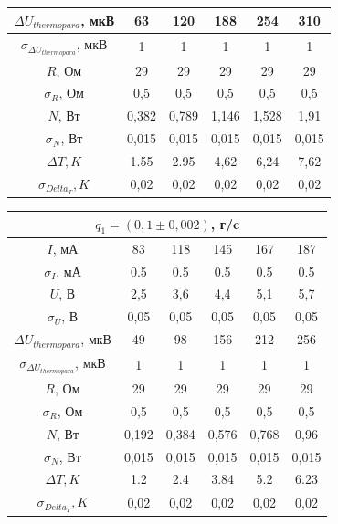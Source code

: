 \documentclass[a4paper, 12pt]{article}%
\begin{document}
\begin{enumerate}
\begin{center}
\begin{tabular}{|c|c|c|c|c|c|}
$\Delta U_{thermopara}$, мкВ & 63 & 120 & 188 & 254 & 310 \\ \hline
$\sigma_{\Delta U_{thermopara}}$, мкВ & 1 & 1 & 1 & 1 & 1 \\ \hline
$R$, Ом & 29 & 29 & 29 & 29 & 29 \\ \hline
$\sigma_R$, Ом & 0,5 & 0,5 & 0,5 & 0,5 & 0,5 \\ \hline
$N$, Вт & 0,382 & 0,789 & 1,146 & 1,528 & 1,91 \\ \hline
$\sigma_N$, Вт & 0,015 & 0,015 & 0,015 & 0,015 & 0,015 \\ \hline
$\Delta T, K$ & 1.55 & 2.95 & 4,62 & 6,24 & 7,62 \\ \hline
$\sigma_{Delta_T}, K$ & 0,02 & 0,02 & 0,02 & 0,02 & 0,02 \\ \hline
\end{tabular}

\begin{tabular}{|c|c|c|c|c|c|}
\hline
\multicolumn{6}{|c|}{$q_1 = (0,1 \pm0,002)$, г/c} \\ \hline
$I$, мА & 83 & 118 & 145 & 167 & 187 \\ \hline
$\sigma_I$, мА & 0.5 & 0.5 & 0.5 & 0.5 & 0.5 \\ \hline
$U$, В & 2,5 & 3,6 & 4,4 & 5,1 & 5,7 \\ \hline
$\sigma_U$, В & 0,05 & 0,05 & 0,05 & 0,05 & 0,05 \\ \hline
$\Delta U_{thermopara}$, мкВ & 49 & 98 & 156 & 212 & 256 \\ \hline
$\sigma_{\Delta U_{thermopara}}$, мкВ & 1 & 1 & 1 & 1 & 1 \\ \hline
$R$, Ом & 29 & 29 & 29 & 29 & 29 \\ \hline
$\sigma_R$, Ом & 0,5 & 0,5 & 0,5 & 0,5 & 0,5 \\ \hline
$N$, Вт & 0,192 & 0,384 & 0,576 & 0,768 & 0,96 \\ \hline
$\sigma_N$, Вт & 0,015 & 0,015 & 0,015 & 0,015 & 0,015 \\ \hline
$\Delta T, K$ & 1.2 & 2.4 & 3.84 & 5.2 & 6.23 \\ \hline
$\sigma_{Delta_T}, K$ & 0,02 & 0,02 & 0,02 & 0,02 & 0,02 \\ \hline
\end{tabular}

\end{center}
\end{enumerate}
\end{document}
